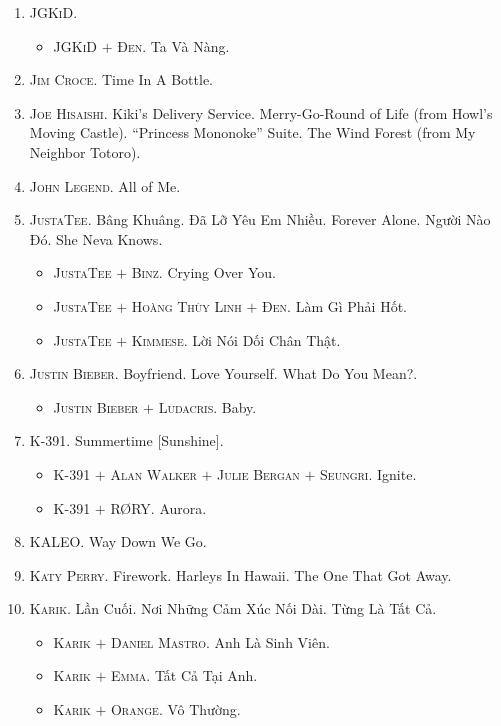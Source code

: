 \documentclass{article}
\numberwithin{equation}{section}
\begin{document}
\begin{enumerate}
\begin{itemize}
	\end{itemize}
	\item \textsc{JGKiD.}
	\begin{itemize}
		\item \textsc{JGKiD $+$ Đen.} Ta Và Nàng.
	\end{itemize}
	\item \textsc{Jim Croce.} Time In A Bottle.
	\item \textsc{Joe Hisaishi.} Kiki's Delivery Service. Merry-Go-Round of Life (from Howl's Moving Castle). ``Princess Mononoke'' Suite. The Wind Forest (from My Neighbor Totoro).
	\item \textsc{John Legend.} All of Me.
	\item \textsc{JustaTee.} Bâng Khuâng. Đã Lỡ Yêu Em Nhiều. Forever Alone. Người Nào Đó. She Neva Knows.
	\begin{itemize}
		\item \textsc{JustaTee $+$ Binz.} Crying Over You.
		\item \textsc{JustaTee $+$ Hoàng Thùy Linh $+$ Đen.} Làm Gì Phải Hốt.
		\item \textsc{JustaTee $+$ Kimmese.} Lời Nói Dối Chân Thật.
	\end{itemize}
	\item \textsc{Justin Bieber.} Boyfriend. Love Yourself. What Do You Mean?.
	\begin{itemize}
		\item \textsc{Justin Bieber $+$ Ludacris.} Baby.
	\end{itemize}
	\item \textsc{K-391.} Summertime [Sunshine].
	\begin{itemize}
		\item \textsc{K-391 $+$ Alan Walker $+$ Julie Bergan $+$ Seungri.} Ignite.
		\item \textsc{K-391 $+$ R{\O}RY.} Aurora.
	\end{itemize}
	\item \textsc{KALEO.} Way Down We Go.
	\item \textsc{Katy Perry.} Firework. Harleys In Hawaii. The One That Got Away.
	\item \textsc{Karik.} Lần Cuối. Nơi Những Cảm Xúc Nối Dài. Từng Là Tất Cả.
	\begin{itemize}
		\item \textsc{Karik $+$ Daniel Mastro.} Anh Là Sinh Viên.
		\item \textsc{Karik $+$ Emma.} Tất Cả Tại Anh.
		\item \textsc{Karik $+$ Orange.} Vô Thường.

\end{itemize}
\end{enumerate}
\end{document}
